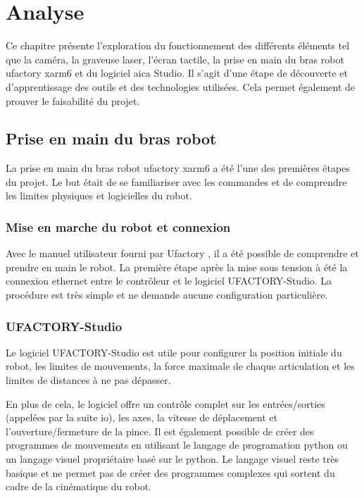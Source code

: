 \chapter{Analyse}
\label{chap:analyse}

Ce chapitre présente l'exploration du fonctionnement des différents éléments tel que la caméra, la graveuse laser, l'écran tactile, la prise en main du bras robot \gls{ufactory} \gls{xarm6} et du logiciel \gls{aica} Studio. Il s'agit d'une étape de découverte et d'apprentissage des outils et des technologies utilisées. Cela permet également de prouver le faisabilité du projet.

\section{Prise en main du bras robot}
La prise en main du bras robot \gls{ufactory} \gls{xarm6} a été l'une des premières étapes du projet. Le but était de se familiariser avec les commandes et de comprendre les limites physiques et logicielles du robot.

\subsection{Mise en marche du robot et connexion}
Avec le manuel utilisateur fourni par Ufactory \cite{UserManual}, il a été possible de comprendre et prendre en main le robot. La première étape après la mise sous tension à été la connexion ethernet entre le contrôleur et le logiciel UFACTORY-Studio. La procédure est très simple et ne demande aucune configuration particulière.

\subsection{UFACTORY-Studio}
Le logiciel UFACTORY-Studio est utile pour configurer la position initiale du robot, les limites de mouvements, la force maximale de chaque articulation et les limites de distances à ne pas dépasser.

En plus de cela, le logiciel offre un contrôle complet sur les entrées/sorties (appelées par la suite \gls{io}), les axes, la vitesse de déplacement et l'ouverture/fermeture de la pince. Il est également possible de créer des programmes de mouvements en utilisant le langage  de programation \gls{python} ou un langage visuel propriétaire basé sur le \gls{python}. Le langage visuel reste très basique et ne permet pas de créer des programmes complexes qui sortent du cadre de la cinématique du robot.

